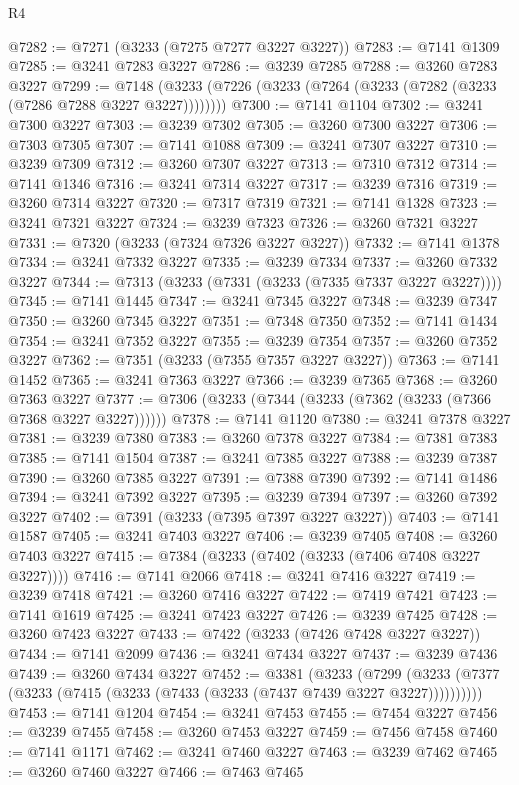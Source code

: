 \begin{lexlean}{R4}
\begin{coremodule}
@7282 := @7271 (@3233 (@7275 @7277 @3227 @3227))
@7283 := @7141 @1309
@7285 := @3241 @7283 @3227
@7286 := @3239 @7285
@7288 := @3260 @7283 @3227
@7299 := @7148 (@3233 (@7226 (@3233 (@7264 (@3233 (@7282 (@3233 (@7286 @7288 @3227 @3227))))))))
@7300 := @7141 @1104
@7302 := @3241 @7300 @3227
@7303 := @3239 @7302
@7305 := @3260 @7300 @3227
@7306 := @7303 @7305
@7307 := @7141 @1088
@7309 := @3241 @7307 @3227
@7310 := @3239 @7309
@7312 := @3260 @7307 @3227
@7313 := @7310 @7312
@7314 := @7141 @1346
@7316 := @3241 @7314 @3227
@7317 := @3239 @7316
@7319 := @3260 @7314 @3227
@7320 := @7317 @7319
@7321 := @7141 @1328
@7323 := @3241 @7321 @3227
@7324 := @3239 @7323
@7326 := @3260 @7321 @3227
@7331 := @7320 (@3233 (@7324 @7326 @3227 @3227))
@7332 := @7141 @1378
@7334 := @3241 @7332 @3227
@7335 := @3239 @7334
@7337 := @3260 @7332 @3227
@7344 := @7313 (@3233 (@7331 (@3233 (@7335 @7337 @3227 @3227))))
@7345 := @7141 @1445
@7347 := @3241 @7345 @3227
@7348 := @3239 @7347
@7350 := @3260 @7345 @3227
@7351 := @7348 @7350
@7352 := @7141 @1434
@7354 := @3241 @7352 @3227
@7355 := @3239 @7354
@7357 := @3260 @7352 @3227
@7362 := @7351 (@3233 (@7355 @7357 @3227 @3227))
@7363 := @7141 @1452
@7365 := @3241 @7363 @3227
@7366 := @3239 @7365
@7368 := @3260 @7363 @3227
@7377 := @7306 (@3233 (@7344 (@3233 (@7362 (@3233 (@7366 @7368 @3227 @3227))))))
@7378 := @7141 @1120
@7380 := @3241 @7378 @3227
@7381 := @3239 @7380
@7383 := @3260 @7378 @3227
@7384 := @7381 @7383
@7385 := @7141 @1504
@7387 := @3241 @7385 @3227
@7388 := @3239 @7387
@7390 := @3260 @7385 @3227
@7391 := @7388 @7390
@7392 := @7141 @1486
@7394 := @3241 @7392 @3227
@7395 := @3239 @7394
@7397 := @3260 @7392 @3227
@7402 := @7391 (@3233 (@7395 @7397 @3227 @3227))
@7403 := @7141 @1587
@7405 := @3241 @7403 @3227
@7406 := @3239 @7405
@7408 := @3260 @7403 @3227
@7415 := @7384 (@3233 (@7402 (@3233 (@7406 @7408 @3227 @3227))))
@7416 := @7141 @2066
@7418 := @3241 @7416 @3227
@7419 := @3239 @7418
@7421 := @3260 @7416 @3227
@7422 := @7419 @7421
@7423 := @7141 @1619
@7425 := @3241 @7423 @3227
@7426 := @3239 @7425
@7428 := @3260 @7423 @3227
@7433 := @7422 (@3233 (@7426 @7428 @3227 @3227))
@7434 := @7141 @2099
@7436 := @3241 @7434 @3227
@7437 := @3239 @7436
@7439 := @3260 @7434 @3227
@7452 := @3381
    (@3233
      (@7299 (@3233 (@7377 (@3233 (@7415 (@3233 (@7433 (@3233 (@7437 @7439 @3227 @3227))))))))))
@7453 := @7141 @1204
@7454 := @3241 @7453
@7455 := @7454 @3227
@7456 := @3239 @7455
@7458 := @3260 @7453 @3227
@7459 := @7456 @7458
@7460 := @7141 @1171
@7462 := @3241 @7460 @3227
@7463 := @3239 @7462
@7465 := @3260 @7460 @3227
@7466 := @7463 @7465

\end{coremodule}
\end{lexlean}
